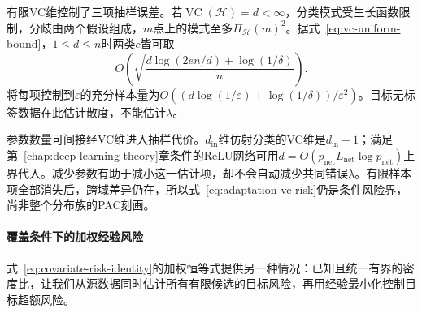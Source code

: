 有限VC维控制了三项抽样误差。若$\operatorname{VC}(\mathcal H)=d<\infty$，分类模式受生长函数限制，分歧由两个假设组成，$m$点上的模式至多$\Pi_{\mathcal H}(m)^2$。据式~\eqref{eq:vc-uniform-bound}，$1\leq d\leq n$时两类$c$皆可取
\[
 O\!\left(\sqrt{\frac{d\log(2en/d)+\log(1/\delta)}{n}}\right).
\]
将每项控制到$\varepsilon$的充分样本量为$O((d\log(1/\varepsilon)+\log(1/\delta))/\varepsilon^2)$。目标无标签数据在此估计散度，不能估计$\lambda$。

参数数量可间接经VC维进入抽样代价。$d_{\mathrm{in}}$维仿射分类的VC维是$d_{\mathrm{in}}+1$；满足第~\ref{chap:deep-learning-theory}章条件的ReLU网络可用$d=O(p_{\mathrm{net}}L_{\mathrm{net}}\log p_{\mathrm{net}})$上界代入。减少参数有助于减小这一估计项，却不会自动减少共同错误$\lambda$。有限样本项全部消失后，跨域差异仍在，所以式~\eqref{eq:adaptation-vc-risk}仍是条件风险界，尚非整个分布族的PAC刻画。

\paragraph{覆盖条件下的加权经验风险}
\label{sec:adaptation-coverage}

式~\eqref{eq:covariate-risk-identity}的加权恒等式提供另一种情况：已知且统一有界的密度比，让我们从源数据同时估计所有有限候选的目标风险，再用经验最小化控制目标超额风险。

